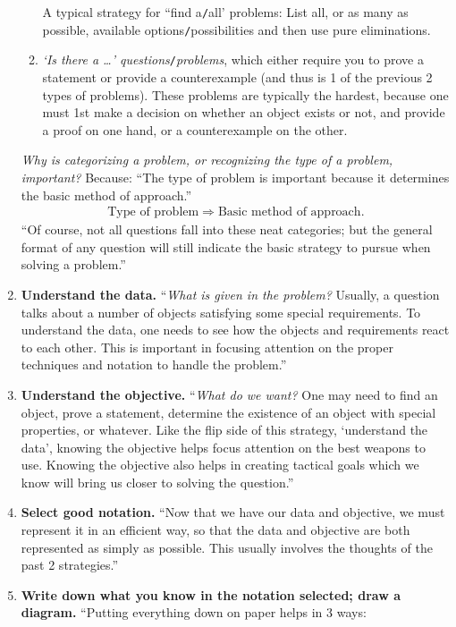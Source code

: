 \documentclass[oneside]{book}
\numberwithin{equation}{section}
\begin{document}
\begin{enumerate}
\begin{enumerate}
		A typical strategy for ``find a\texttt{/}all' problems: List all, or as many as possible, available options\texttt{/}possibilities and then use pure eliminations.
		\item \textit{`Is there a \ldots' questions}\texttt{/}\textit{problems}, which either require you to prove a statement or provide a counterexample (and thus is 1 of the previous 2 types of problems). These problems are typically the hardest, because one must 1st make a decision on whether an object exists or not, and provide a proof on one hand, or a counterexample on the other.
	\end{enumerate}
	\textit{Why is categorizing a problem, or recognizing the type of a problem, important?} Because: ``The type of problem is important because it determines the basic method of approach.''
	\begin{align*}
		\boxed{\mbox{Type of problem}\Rightarrow\mbox{Basic method of approach}.}
	\end{align*}
	``Of course, not all questions fall into these neat categories; but the general format of any question will still indicate the basic strategy to pursue when solving a problem.''
	\item \textbf{Understand the data.} ``\textit{What is given in the problem?} Usually, a question talks about a number of objects satisfying some special requirements. To understand the data, one needs to see how the objects and requirements react to each other. This is important in focusing attention on the proper techniques and notation to handle the problem.''
	\item \textbf{Understand the objective.} ``\textit{What do we want?} One may need to find an object, prove a statement, determine the existence of an object with special properties, or whatever. Like the flip side of this strategy, `understand the data', knowing the objective helps focus attention on the best weapons to use. Knowing the objective also helps in creating tactical goals which we know will bring us closer to solving the question.''
	\item \textbf{Select good notation.} ``Now that we have our data and objective, we must represent it in an efficient way, so that the data and objective are both represented as simply as possible. This usually involves the thoughts of the past 2 strategies.''
	\item \textbf{Write down what you know in the notation selected; draw a diagram.} ``Putting everything down on paper helps in 3 ways:
	\begin{enumerate}

\end{enumerate}
\end{enumerate}
\end{document}
